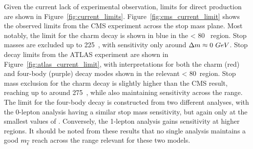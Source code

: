 Given the current lack of experimental observation, limits for direct \sTop
production are shown in Figure~\ref{fig:current_limits}. Figure~\ref{fig:cms_current_limit}
shows the observed limits from the CMS experiment across the stop mass plane.
Most notably, the limit for the charm decay is shown in blue in the \deltam < 80~\gev
region. Stop masses are excluded up to 225~\gev, with sensitivity only around
$\Delta m \approx 0 ~GeV$. Stop decay limits from the ATLAS experiment are shown
in Figure~\ref{fig:atlas_current_limit}, with interpretations for both the charm (red) and
four-body (purple) decay modes shown in the relevant \deltam < 80~\gev region. Stop mass exclusion 
for the charm decay is slightly higher than the CMS result, reaching up to around 275~\gev, while
also maintaining sensitivity across the \deltam range. The limit
for the four-body decay is constructed from two different analyses, with the 0-lepton analysis
having a similar stop mass sensitivity, but again only at the smallest values of \deltam. Conversely, 
the 1-lepton analysis gains sensitivity at higher \deltam regions. It should be noted from these
results that no single analysis maintains a good $m_{\widetilde{t}}$ reach across the \deltam range relevant
for these two models.
